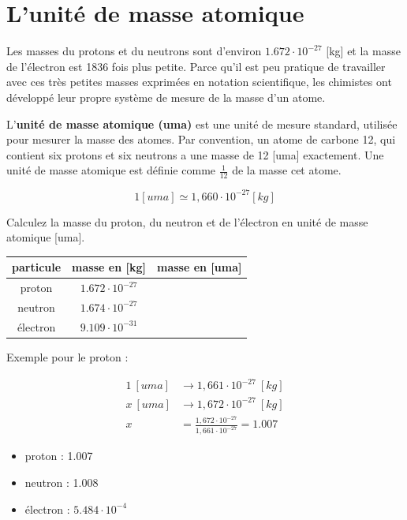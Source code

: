 \documentclass[
  11pt,
  a4paper,
  openany]{book}
\providecommand{\tightlist}{%
  \setlength{\itemsep}{0pt}\setlength{\parskip}{0pt}}
\begin{document}
\hypertarget{lunituxe9-de-masse-atomique}{%
\section{L'unité de masse atomique}\label{lunituxe9-de-masse-atomique}}

Les masses du protons et du neutrons sont d'environ \(1.672\cdot10^{-27}\) {[}kg{]} et la masse de l'électron est 1836 fois plus petite. Parce qu'il est peu pratique de travailler avec ces très petites masses exprimées en notation scientifique, les chimistes ont développé leur propre système de mesure de la masse d'un atome.

L'\textbf{unité de masse atomique (uma)} est une unité de mesure standard, utilisée pour mesurer la masse des atomes. Par convention, un atome de carbone 12, qui contient six protons et six neutrons a une masse de 12 {[}uma{]} exactement. Une unité de masse atomique est définie comme \(\frac{1}{12}\) de la masse cet atome.

\[ 1 [uma] \simeq 1,660 \cdot 10^{-27} [kg] \]

\begin{Exercise}
Calculez la masse du proton, du neutron et de l'électron en unité de masse atomique {[}uma{]}.

\end{Exercise}

\begin{longtable}[]{@{}ccc@{}}
\toprule()
particule & masse en {[}kg{]} & masse en {[}uma{]} \\
\midrule()
\endhead
proton & \(1.672\cdot10^{-27}\) & \\
neutron & \(1.674\cdot10^{-27}\) & \\
électron & \(9.109\cdot10^{-31}\) & \\
\bottomrule()
\end{longtable}


\begin{Answer}

Exemple pour le proton :

\[ \begin{split}
  1~[uma] &\rightarrow 1,661\cdot10^{-27}~[kg] \\
  x~[uma] &\rightarrow 1,672\cdot10^{-27}~[kg] \\
  x &= \frac{1,672\cdot10^{-27}}{1,661\cdot10^{-27}} = 1.007
  \end{split} \]

\begin{itemize}
\tightlist
\item
  proton : 1.007
\item
  neutron : 1.008
\item
  électron : \(5.484\cdot10^{-4}\)
\end{itemize}

\end{Answer}
\end{document}
